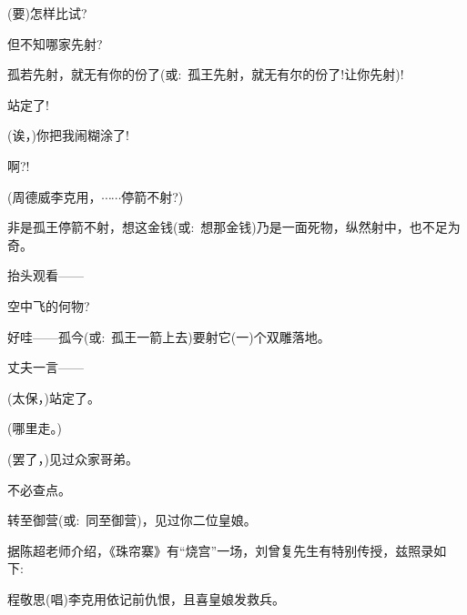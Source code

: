 {(要)怎样比试?

但不知哪家先射?

孤若先射，就无有你的份了({\akai 或}:~孤王先射，就无有尔的份了!让你先射)!

站定了!\hspace{20pt}~



(诶，)你把我闹糊涂了!



啊?!\hspace{40pt}~


(周德威\hspace{20pt}李克用，$\cdots{}\cdots{}$停箭不射?)

非是孤王停箭不射，想这金钱({\akai 或}:~想那金钱)乃是一面死物，纵然射中，也不足为奇。

抬头观看------

空中飞的何物?

好哇------孤今({\akai 或}:~孤王一箭上去)要射它(一)个双雕落地。

丈夫一言------

(太保，)站定了。


(哪里走。)\hspace{10pt}~


(罢了，)见过众家哥弟。

不必查点。

转至御营({\akai 或}:~同至御营)，见过你二位皇娘。

\vspace{20pt}
{\hei 据陈超老师介绍，《珠帘寨》有``烧宫''一场，刘曾复先生有特别传授，兹照录如下:~}

程敬思\hspace{20pt}({\akai 唱})李克用依记前仇恨，且喜皇娘发救兵。

}
